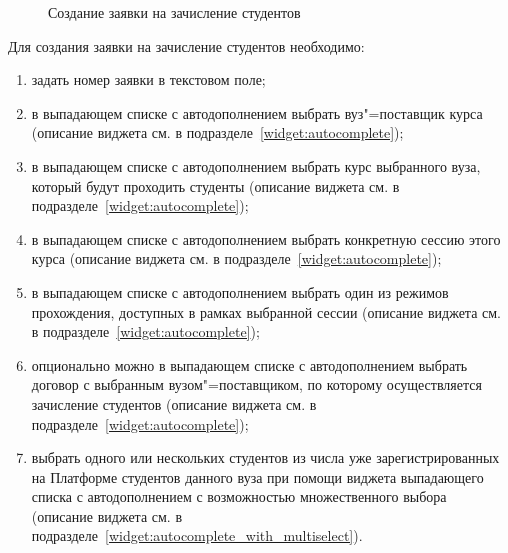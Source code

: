 \begin{figure}[H]
	\caption{Создание заявки на зачисление студентов}
	\label{img:student:enroll_req_create}
\end{figure}

Для создания заявки на зачисление студентов необходимо:
\begin{enumerate}
	\item задать номер заявки в текстовом поле;
	\item в выпадающем списке с автодополнением выбрать вуз"=поставщик курса
	(описание виджета см. в подразделе~\ref{widget:autocomplete});
	\item в выпадающем списке с автодополнением выбрать курс выбранного вуза, который будут проходить студенты 
	(описание виджета см. в подразделе~\ref{widget:autocomplete});
	\item в выпадающем списке с автодополнением выбрать конкретную сессию этого курса 
	(описание виджета см. в подразделе~\ref{widget:autocomplete});
	\item в выпадающем списке с автодополнением выбрать один из режимов прохождения, доступных в рамках выбранной сессии 
	(описание виджета см. в подразделе~\ref{widget:autocomplete});
	\item опционально можно в выпадающем списке с автодополнением выбрать договор с выбранным вузом"=поставщиком, 
	по которому осуществляется зачисление студентов (описание виджета см. в подразделе~\ref{widget:autocomplete});
	\item выбрать одного или нескольких студентов из числа уже зарегистрированных на Платформе студентов данного вуза 
	при помощи виджета выпадающего списка с автодополнением с возможностью множественного выбора 
	(описание виджета см. в подразделе~\ref{widget:autocomplete_with_multiselect}). 
\end{enumerate}


